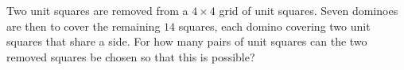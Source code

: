 Two unit squares are removed from a $4\times4$ grid of unit squares. Seven dominoes are then to cover the remaining $14$ squares, each domino covering two unit squares that share a side. For how many pairs of unit squares can the two removed squares be chosen so that this is possible?
